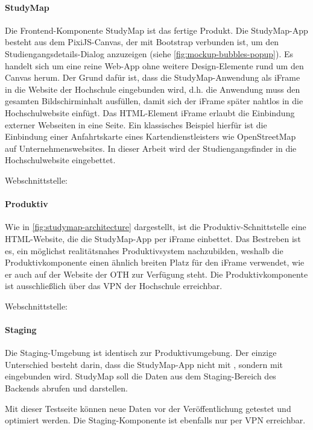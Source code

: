 \paragraph*{StudyMap}
Die Frontend-Komponente StudyMap ist das fertige Produkt. Die StudyMap-App besteht aus dem PixiJS-Canvas, der mit Bootstrap verbunden ist, um den Studiengangsdetails-Dialog anzuzeigen (siehe \autoref{fig:mockup-bubbles-popup}). Es handelt sich um eine reine Web-App ohne weitere Design-Elemente rund um den Canvas herum. Der Grund dafür ist, dass die StudyMap-Anwendung als iFrame in die Website der Hochschule eingebunden wird, d.h. die Anwendung muss den gesamten Bildschirminhalt ausfüllen, damit sich der iFrame später nahtlos in die Hochschulwebsite einfügt. Das HTML-Element iFrame erlaubt die Einbindung externer Webseiten in eine Seite. Ein klassisches Beispiel hierfür ist die Einbindung einer Anfahrtskarte eines Kartendienstleisters wie OpenStreetMap auf Unternehmenswebsites. \parencite{mozilla_corporation_iframe_2024} In dieser Arbeit wird der Studiengangsfinder in die Hochschulwebsite eingebettet.

\noindent
Webschnittstelle: 

\paragraph*{Produktiv}
Wie in \autoref{fig:studymap-architecture} dargestellt, ist die Produktiv-Schnittstelle eine HTML-Website, die die StudyMap-App per iFrame einbettet.  Das Bestreben ist es, ein möglichst realitätsnahes Produktivsystem nachzubilden, weshalb die Produktivkomponente einen ähnlich breiten Platz für den iFrame verwendet, wie er auch auf der Website der OTH zur Verfügung steht. Die Produktivkomponente ist ausschließlich über das VPN der Hochschule erreichbar.

\noindent
Webschnittstelle: 

\paragraph*{Staging}
Die Staging-Umgebung ist identisch zur Produktivumgebung. Der einzige Unterschied besteht darin, dass die StudyMap-App nicht mit , sondern mit  eingebunden wird. StudyMap soll die Daten aus dem Staging-Bereich des Backends abrufen und darstellen.

Mit dieser Testseite können neue Daten vor der Veröffentlichung getestet und optimiert werden. Die Staging-Komponente ist ebenfalls nur per VPN erreichbar.

